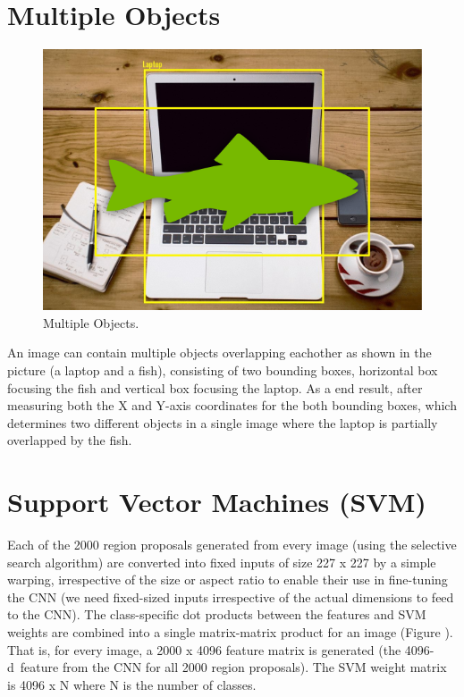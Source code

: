 \documentclass[a4paper,13pt,twoside]{book}
\begin{document}
\section{Multiple Objects}

\begin{figure}[h!]
  \includegraphics[width=\linewidth]{Images/multipleobjects28.png}
  \caption{Multiple Objects.}
  \label{fig:Multiple Objects}
\end{figure}

An image can contain multiple objects overlapping eachother as shown in the picture (a laptop and a fish), consisting of two bounding boxes, horizontal box focusing the fish and vertical box focusing the laptop.
As a end result, after measuring both the X and Y-axis coordinates for the both bounding boxes, which determines two different objects in a single image where the laptop is partially overlapped by the fish.

\section{Support Vector Machines (SVM)}

Each of the 2000 region proposals generated from every image (using the selective search algorithm) are converted into fixed inputs of size 227 x 227 by a simple warping, irrespective of the size or aspect ratio to enable their use in fine-tuning the CNN (we need fixed-sized inputs irrespective of the actual dimensions to feed to the CNN).
The class-specific dot products between the features and SVM weights are combined into a single matrix-matrix product for an image (Figure ). That is, for every image, a 2000 x 4096 feature matrix is generated (the 4096-d feature from the CNN for all 2000 region proposals). The SVM weight matrix is 4096 x N where N is the number of classes.
\end{document}
